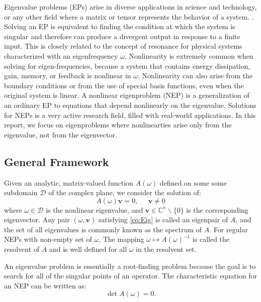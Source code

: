 \documentclass[final,leqno,onefignum,onetabnum]{siamltex1213}
\begin{document}
Eigenvalue problems (EPs) arise in diverse applications in science and technology, or any other field where a matrix or tensor represents the behavior of a system. \citep{guillaume_nonlinear_1999, betcke2013nlevp}. Solving an EP is equivalent to finding the condition at which the system is singular and therefore can produce a divergent output in response to a finite input. This is closely related to the concept of resonance for physical systems characterized with an eigenfrequency $\omega$. Nonlinearity is extremely common when solving for eigen-frequencies, because a system that contains energy dissipation, gain, memory, or feedback is nonlinear in $\omega$. Nonlinearity can also arise from the boundary conditions or from the use of special basis functions, even when the original system is linear. A nonlinear eigenproblem (NEP) is a generalization of an ordinary EP to equations that depend nonlinearly on the eigenvalue. Solutions for NEPs is a very active research field, filled with real-world applications. In this report, we focus on eigenproblems where nonlinearties arise only from the eigenvalue, not from the eigenvector.  

\subsection{General Framework}
Given an analytic, matrix-valued function $A(\omega)$ defined on some some subdomain $\mathcal{D}$ of the complex plane, we consider the solution of:
\begin{equation}\label{eq:Eig}
    A(\omega) \mathbf{v} = 0,\;\;\;\;\;\mathbf{v}\neq 0
\end{equation}
where $\omega \in \mathcal{D}$ is the nonlinear eigenvalue, and $\mathbf{v} \in \mathbb{C}^n\backslash\{0\}$ is the corresponding eigenvector. Any pair $(\omega, \mathbf{v})$ satisfying \ref{eq:Eig} is called an eigenpair of $A$, and the set of all eigenvalues is commonly known as the spectrum of $A$. For regular NEPs with non-empty set of $\omega$, The mapping $\omega \mapsto A(\omega)^{-1}$ is called the resolvent of $A$ and is well defined for all $\omega$ in the resolvent set. 

\pagebreak
An eigenvalue problem is essentially a root-finding problem because the goal is to search for all of the singular points of an operator. The characteristic equation for an NEP can be written as:
\begin{equation}\label{eq:charNEP}
\det A(\omega) = 0. 
\end{equation}
\end{document}
